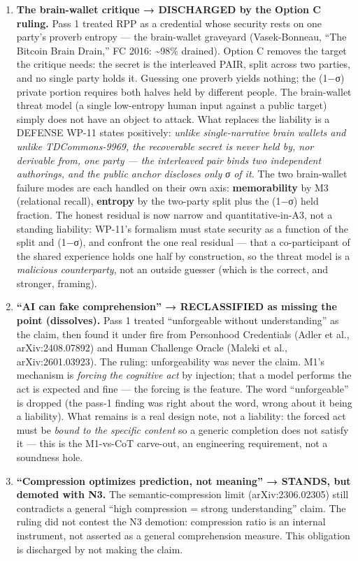 \documentclass[
  11pt,
]{article}
\begin{document}
\begin{enumerate}
\def\labelenumi{\arabic{enumi}.}
\item
  \textbf{The brain-wallet critique → DISCHARGED by the Option C
  ruling.} Pass 1 treated RPP as a credential whose security rests on
  one party's proverb entropy --- the brain-wallet graveyard
  (Vasek-Bonneau, ``The Bitcoin Brain Drain,'' FC 2016:
  \textasciitilde98\% drained). Option C removes the target the critique
  needs: the secret is the interleaved PAIR, split across two parties,
  and no single party holds it. Guessing one proverb yields nothing; the
  (1−σ) private portion requires both halves held by different people.
  The brain-wallet threat model (a single low-entropy human input
  against a public target) simply does not have an object to attack.
  What replaces the liability is a DEFENSE WP-11 states positively:
  \emph{unlike single-narrative brain wallets and unlike TDCommons-9969,
  the recoverable secret is never held by, nor derivable from, one party
  --- the interleaved pair binds two independent authorings, and the
  public anchor discloses only σ of it.} The two brain-wallet failure
  modes are each handled on their own axis: \textbf{memorability} by M3
  (relational recall), \textbf{entropy} by the two-party split plus the
  (1−σ) held fraction. The honest residual is now narrow and
  quantitative-in-A3, not a standing liability: WP-11's formalism must
  state security as a function of the split and (1−σ), and confront the
  one real residual --- that a co-participant of the shared experience
  holds one half by construction, so the threat model is a
  \emph{malicious counterparty}, not an outside guesser (which is the
  correct, and stronger, framing).
\item
  \textbf{``AI can fake comprehension'' → RECLASSIFIED as missing the
  point (dissolves).} Pass 1 treated ``unforgeable without
  understanding'' as the claim, then found it under fire from Personhood
  Credentials (Adler et al., arXiv:2408.07892) and Human Challenge
  Oracle (Maleki et al., arXiv:2601.03923). The ruling: unforgeability
  was never the claim. M1's mechanism is \emph{forcing the cognitive
  act} by injection; that a model performs the act is expected and fine
  --- the forcing is the feature. The word ``unforgeable'' is dropped
  (the pass-1 finding was right about the word, wrong about it being a
  liability). What remains is a real design note, not a liability: the
  forced act must be \emph{bound to the specific content} so a generic
  completion does not satisfy it --- this is the M1-vs-CoT carve-out, an
  engineering requirement, not a soundness hole.
\item
  \textbf{``Compression optimizes prediction, not meaning'' → STANDS,
  but demoted with N3.} The semantic-compression limit
  (arXiv:2306.02305) still contradicts a general ``high compression =
  strong understanding'' claim. The ruling did not contest the N3
  demotion: compression ratio is an internal instrument, not asserted as
  a general comprehension measure. This obligation is discharged by not
  making the claim.
\end{enumerate}
\end{document}
